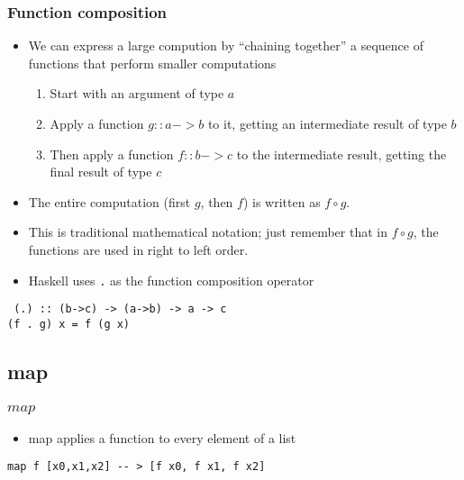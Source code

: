 \documentclass{beamer}
\begin{document}
\begin{frame}[fragile]
\frametitle{Function composition}

\begin{itemize}
\item We can express a large compution by ``chaining together'' a
  sequence of functions that perform smaller computations
  \begin{enumerate}
  \item Start with an argument of type $a$
  \item Apply a function $g :: a->b$ to it, getting an intermediate
    result of type $b$
  \item Then apply a function  $f :: b->c$ to the intermediate
    result, getting the final result of type $c$
  \end{enumerate}
\item The entire computation (first $g$, then $f$) is written as $f
  \circ g$.
\item This is traditional mathematical notation; just remember that
  in $f \circ g$, the functions are used in right to left order.
  \item Haskell uses \texttt{.} as the function composition operator
\end{itemize}

\begin{verbatim}
 (.) :: (b->c) -> (a->b) -> a -> c
(f . g) x = f (g x)
\end{verbatim}

\end{frame}

\subsection{map}
\begin{frame}[fragile]
\frametitle{$map$}

\begin{itemize}
\item map applies a function to every element of a list
\end{itemize}


\begin{verbatim}
map f [x0,x1,x2] -- > [f x0, f x1, f x2]
\end{verbatim}

\end{frame}
\end{document}
